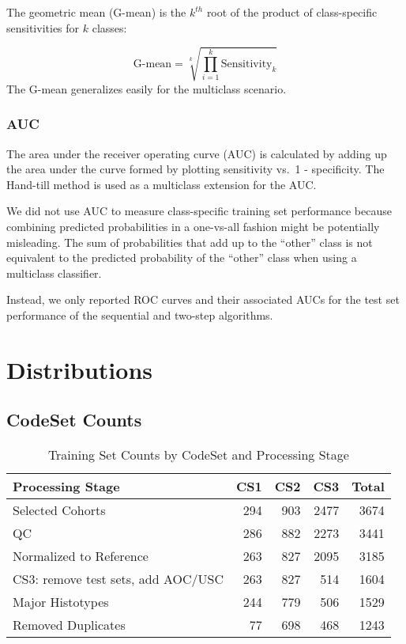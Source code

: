 \documentclass[
]{report}
\begin{document}
The geometric mean (G-mean) is the \(k^{th}\) root of the product of class-specific sensitivities for \(k\) classes:

\[
\text{G-mean} = \sqrt[k]{\prod_{i=1}^{k}{\text{Sensitivity}_k}}
\label{eq:gmean}
\] The G-mean generalizes easily for the multiclass scenario.

\subsection{AUC}\label{auc}

The area under the receiver operating curve (AUC) is calculated by adding up the area under the curve formed by plotting sensitivity vs.~1 - specificity. The Hand-till method is used as a multiclass extension for the AUC.

We did not use AUC to measure class-specific training set performance because combining predicted probabilities in a one-vs-all fashion might be potentially misleading. The sum of probabilities that add up to the ``other'' class is not equivalent to the predicted probability of the ``other'' class when using a multiclass classifier.

Instead, we only reported ROC curves and their associated AUCs for the test set performance of the sequential and two-step algorithms.

\chapter{Distributions}\label{distributions}

\section{CodeSet Counts}\label{codeset-counts}

\begin{table}

\caption{\label{tab:codeset-counts}Training Set Counts by CodeSet and Processing Stage}
\centering
\begin{tabular}[t]{l|r|r|r|r}
\hline
Processing Stage & CS1 & CS2 & CS3 & Total\\
\hline
Selected Cohorts & 294 & 903 & 2477 & 3674\\
\hline
QC & 286 & 882 & 2273 & 3441\\
\hline
Normalized to Reference & 263 & 827 & 2095 & 3185\\
\hline
CS3: remove test sets, add AOC/USC & 263 & 827 & 514 & 1604\\
\hline
Major Histotypes & 244 & 779 & 506 & 1529\\
\hline
Removed Duplicates & 77 & 698 & 468 & 1243\\
\hline
\end{tabular}
\end{table}
\end{document}
